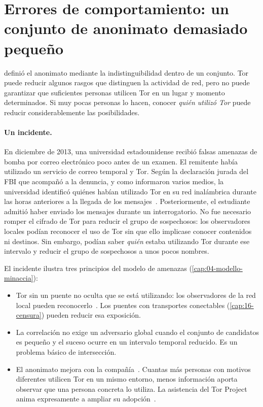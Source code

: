 \section{Errores de comportamiento: un conjunto de anonimato demasiado pequeño}\label{sec:opsec-insieme}

 definió el anonimato mediante la indistinguibilidad dentro de un conjunto. Tor puede reducir algunos rasgos que distinguen la actividad de red, pero no puede garantizar que suficientes personas utilicen Tor en un lugar y momento determinados. Si muy pocas personas lo hacen, conocer \emph{quién utilizó Tor} puede reducir considerablemente las posibilidades.

\paragraph{Un incidente.} En diciembre de 2013, una universidad estadounidense recibió falsas amenazas de bomba por correo electrónico poco antes de un examen. El remitente había utilizado un servicio de correo temporal y Tor. Según la declaración jurada del FBI que acompañó a la denuncia, y como informaron varios medios, la universidad identificó quiénes habían utilizado Tor en su red inalámbrica durante las horas anteriores a la llegada de los mensajes~\cite{wbur2013harvard,sandvik2013harvard}. Posteriormente, el estudiante admitió haber enviado los mensajes durante un interrogatorio. No fue necesario romper el cifrado de Tor para reducir el grupo de sospechosos: los observadores locales podían reconocer el uso de Tor sin que ello implicase conocer contenidos ni destinos. Sin embargo, podían saber \emph{quién} estaba utilizando Tor durante ese intervalo y reducir el grupo de sospechosos a unos pocos nombres.

El incidente ilustra tres principios del modelo de amenazas (\cref{cap:04-modello-minaccia}):
\begin{itemize}
  \item Tor sin un puente no oculta que se está utilizando: los observadores de la red local pueden reconocerlo~\cite{tailswarnings}. Los puentes con transportes conectables (\cref{cap:16-censura}) pueden reducir esa exposición.
  \item La correlación no exige un adversario global cuando el conjunto de candidatos es pequeño y el suceso ocurre en un intervalo temporal reducido. Es un problema básico de intersección.
  \item El anonimato mejora con la compañía~\cite{dingledine2006company}. Cuantas más personas con motivos diferentes utilicen Tor en un mismo entorno, menos información aporta observar que una persona concreta lo utiliza. La asistencia del Tor Project anima expresamente a ampliar su adopción~\cite{torsafety}.
\end{itemize}

